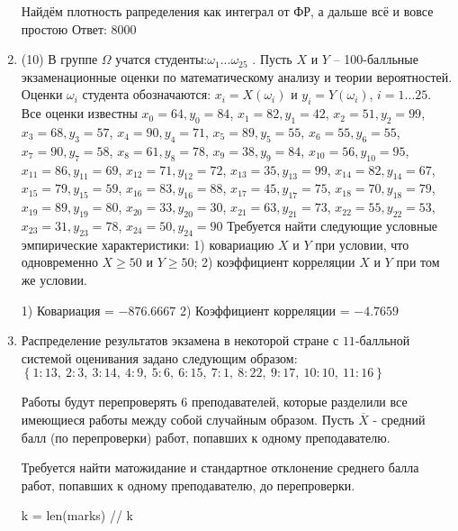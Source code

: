 \documentclass[a4paper,12pt]{article}
\begin{document}
\begin{enumerate}
Найдём плотность рапределения как интеграл от ФР, а дальше всё и вовсе простою Ответ: $8000$


\item


(10) В группе $\Omega$ учатся студенты:$\omega _{1}...\omega _{25}$ . Пусть $X$ и $Y$ – 100-балльные экзаменационные оценки по
математическому анализу и теории вероятностей. Оценки $\omega _{i}$ студента обозначаются: $x _{i} = X(\omega _{i})$ и $y _{i} = Y(\omega _{i})$, $i = 1...25$. Все оценки известны
$x _{0} = 64, y _{0} = 84$, $x _{1} = 82, y _{1} = 42$, $x _{2} = 51, y _{2} = 99$, $x _{3} = 68, y _{3} = 57$, $x _{4} = 90, y _{4} = 71$, $x _{5} = 89, y _{5} = 55$, $x _{6} = 55, y _{6} = 55$, $x _{7} = 90, y _{7} = 58$, $x _{8} = 61, y _{8} = 78$, $x _{9} = 38, y _{9} = 84$, $x _{10} = 56, y _{10} = 95$, $x _{11} = 86, y _{11} = 69$, $x _{12} = 71, y _{12} = 72$, $x _{13} = 35, y _{13} = 99$, $x _{14} = 82, y _{14} = 67$, $x _{15} = 79, y _{15} = 59$, $x _{16} = 83, y _{16} = 88$, $x _{17} = 45, y _{17} = 75$, $x _{18} = 70, y _{18} = 79$, $x _{19} = 89, y _{19} = 80$, $x _{20} = 33, y _{20} = 30$, $x _{21} = 63, y _{21} = 73$, $x _{22} = 55, y _{22} = 53$, $x _{23} = 31, y _{23} = 78$, $x _{24} = 50, y _{24} = 90$
Требуется
найти следующие условные эмпирические характеристики: 1) ковариацию $X$ и $Y$ при условии, что одновременно $X \geqslant 50$
 и $Y \geqslant 50$; 2) коэффициент корреляции $X$ и $Y$ при том же условии.




1) Ковариация = $-876.6667$
2) Коэффициент корреляции = $-4.7659$


\item

    
    	Распределение результатов экзамена в некоторой стране с $11$-балльной системой оценивания задано следующим образом:
    	$\left\{ 1 : 13, \  2 : 3, \  3 : 14, \  4 : 9, \  5 : 6, \  6 : 15, \  7 : 1, \  8 : 22, \  9 : 17, \  10 : 10, \  11 : 16\right\}$

	Работы будут перепроверять $6$ преподавателей, которые разделили все имеющиеся работы между собой случайным образом. Пусть $\overline{X}$ - средний балл (по перепроверки) работ, попавших к одному преподавателю.

	Требуется найти матожидание и стандартное отклонение среднего балла работ, попавших к одному преподавателю, до перепроверки.
    


    


    k = len(marks) // k


\end{enumerate}
\end{document}
